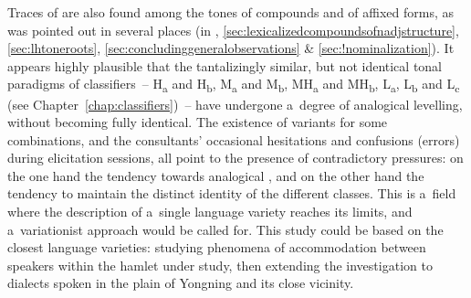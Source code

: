 Traces of  are also found among the tones of compounds and of affixed forms, as was pointed out in several places (in , \ref{sec:lexicalizedcompoundsofnadjstructure}, \ref{sec:lhtoneroots}, \ref{sec:concludinggeneralobservations} \& \ref{sec:!nominalization}). 
It appears highly plausible that the tantalizingly similar, but not identical tonal paradigms of
classifiers~-- H\textsubscript{a} and H\textsubscript{b}, M\textsubscript{a} and M\textsubscript{b}, MH\textsubscript{a} and MH\textsubscript{b}, L\textsubscript{a}, L\textsubscript{b} and L\textsubscript{c} (see Chapter~\ref{chap:classifiers})~-- have undergone
a~degree of analogical levelling, without becoming fully identical. The existence of variants for
some combinations, and the consultants' occasional hesitations and confusions (errors) during elicitation
sessions, all point to the presence of contradictory pressures: on the one hand the tendency towards analogical
, and on the other hand the tendency to maintain the distinct identity of the
different classes. This is a~field where the description of a~single language variety reaches its limits, and
a~variationist approach would be called for. This study could be based on the closest language
varieties: studying phenomena of accommodation between speakers within the hamlet under study, then extending the investigation to dialects spoken in the plain of Yongning and its close vicinity. 


